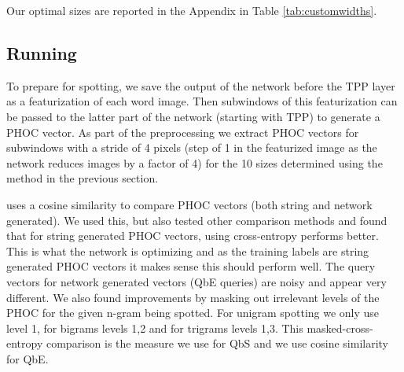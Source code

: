 \documentclass[ms,electronic,twosidetoc,letterpaper,chaptercenter,parttop,lof,lot]{byumsphd}
\begin{document}
Our optimal sizes are reported in the Appendix in Table \ref{tab:customwidths}.


\subsection{Running}

To prepare for spotting, we save the output of the network before the TPP layer as a featurization of each word image. Then subwindows of this featurization can be passed to the latter part of the network (starting with TPP) to generate a PHOC vector. As part of the preprocessing we extract PHOC vectors for subwindows with a stride of 4 pixels (step of 1 in the featurized image as the network reduces images by a factor of 4) for the 10 sizes determined using the method in the previous section.


\cite{sudholt2017} uses a cosine similarity to compare PHOC vectors (both string and network generated). We used this, but also tested other comparison methods and found that for string generated PHOC vectors, using cross-entropy performs better. This is what the network is optimizing and as the training labels are string generated PHOC vectors it makes sense this should perform well. The query vectors for network generated vectors (QbE queries) are noisy and appear very different. We also found improvements by masking out irrelevant levels of the PHOC for the given n-gram being spotted. For unigram spotting we only use level 1, for bigrams levels 1,2 and for trigrams levels 1,3. This masked-cross-entropy comparison is the measure we use for QbS and we use cosine similarity for QbE.
\end{document}
